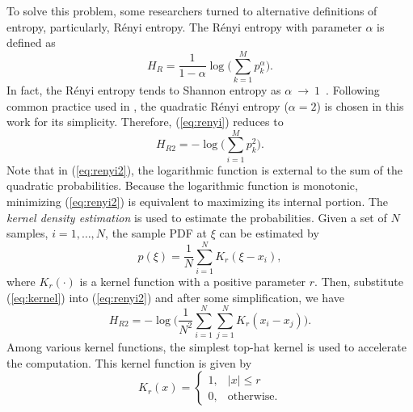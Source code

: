 \documentclass[journal,comsoc]{IEEEtran}
\begin{document}
To solve this problem, some researchers turned to alternative definitions of entropy,
particularly, R\'enyi entropy.
The R\'enyi entropy  with parameter \(\alpha\) is defined as \cite{renyi1961measures}
\begin{equation}
H_{R }={\frac {1}{1-\alpha }}\log {\Bigg (}\sum _{k=1}^{M}p_{k}^{\alpha }{\Bigg )}.
\label{eq:renyi}
\end{equation}
In fact, the R\'enyi entropy tends to Shannon entropy as $\alpha~\to~1$~\cite{Bromiley2004}.
Following common practice used in \cite{Santamaria2002}, the quadratic R\'enyi entropy ($\alpha=2$) is chosen in this work for its simplicity.
Therefore, (\ref{eq:renyi}) reduces to
\begin{equation}
H_{R2 }=-\log {\Bigg (}\sum _{i=1}^{M}p_{k}^{2 }{\Bigg )}.
\label{eq:renyi2}
\end{equation}
Note that in (\ref{eq:renyi2}), the logarithmic function is  external to the sum of the quadratic probabilities.
Because the logarithmic function is monotonic, minimizing (\ref{eq:renyi2}) is equivalent to maximizing its internal portion.
The \textit{kernel density estimation} is used to estimate the probabilities.
Given a set of \(N\) samples, \(i=1, \dots, N\), the sample PDF at \(\xi\) can be estimated by~\cite{Principe2000a}
\begin{equation}
{ p(\xi)={\frac {1}{N}}\sum _{i=1}^{N}K_{r}\left(\xi-x_i\right)},
\label{eq:kernel}
\end{equation}
where $K_r(\cdot)$ is a kernel function with a positive parameter $r$.
Then, substitute (\ref{eq:kernel}) into (\ref{eq:renyi2}) and after some simplification, we have
\begin{equation}
H_{R2 }=-\log {\Bigg (}\frac{1}{N^2}\sum _{i=1}^{N}\sum _{j=1}^{N}K_{r}\left(x_i-x_j\right){\Bigg )}.
\end{equation}
Among various kernel functions, the simplest top-hat kernel is used to accelerate the computation.
This kernel function is given by
\begin{equation}
{\displaystyle K_{r}(x)={\begin{cases}1,&|x|\leq r\\0,&{\mbox{otherwise.}}\end{cases}}}
\end{equation}
\end{document}
